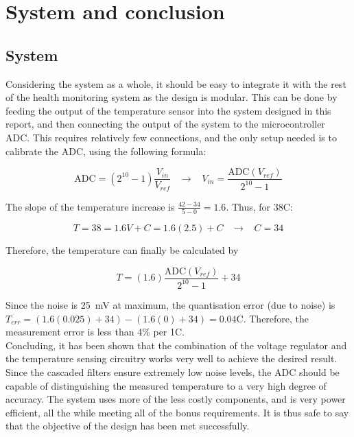 \chapter{System and conclusion}

\section{System}
Considering the system as a whole, it should be easy to integrate it with the rest of the health monitoring system as the design is modular. This can be done by feeding the output of the temperature sensor into the system designed in this report, and then connecting the output of the system to the microcontroller ADC. This requires relatively few connections, and the only setup needed is to calibrate the ADC, using the following formula\cite{cs}:

$$\mathrm{ADC} = (2^{10}-1)\frac{V_{in}}{V_{ref}} \;\;\; \rightarrow \;\;\; V_{in} = \frac{\mathrm{ADC}(V_{ref})}{2^{10}-1}$$

The slope of the temperature increase is $\frac{42-34}{5-0} = 1.6$. Thus, for 38\degree C:

$$T = 38 = 1.6V + C = 1.6(2.5) + C \;\;\; \rightarrow \;\;\; C = 34$$

Therefore, the temperature can finally be calculated by

$$T = (1.6)\frac{\mathrm{ADC}(V_{ref})}{2^{10}-1} + 34$$

Since the noise is \SI{25}{\milli\volt} at maximum, the quantisation error (due to noise) is $T_{err} = (1.6(0.025) + 34) - (1.6(0) + 34) = 0.04$\degree C. Therefore, the measurement error is less than 4\% per 1\degree C.\\

Concluding, it has been shown that the combination of the voltage regulator and the temperature sensing circuitry works very well to achieve the desired result. Since the cascaded filters ensure extremely low noise levels, the ADC should be capable of distinguishing the measured temperature to a very high degree of accuracy. The system uses more of the less costly components, and is very power efficient, all the while meeting all of the bonus requirements. It is thus safe to say that the objective of the design has been met successfully.

